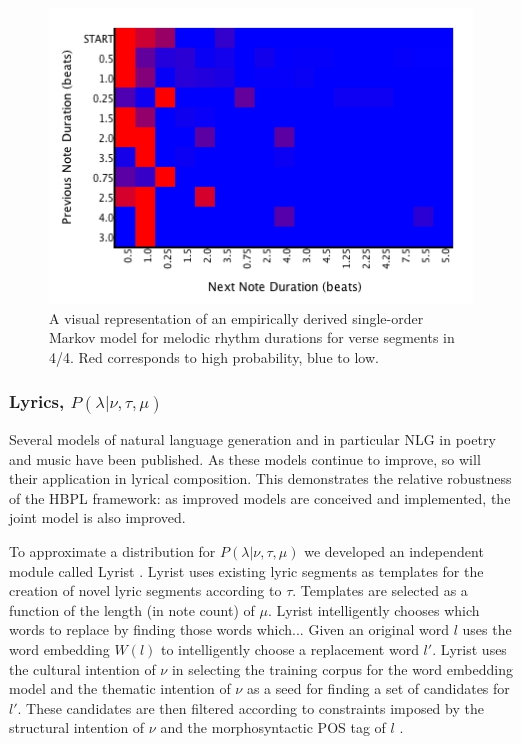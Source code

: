 \documentclass[letterpaper]{article}
\begin{document}
\begin{figure}[t]
	\centering
	\includegraphics[width=\linewidth]{melody_rhythm}
	\caption{\label{fig:melody_rhythm} A visual representation of an empirically derived single-order Markov model for melodic rhythm durations for verse segments in 4/4. Red corresponds to high probability, blue to low.}
\end{figure}

\subsubsection{Lyrics, $P(\lambda|\nu,\tau,\mu)$}

Several models of natural language generation and in particular NLG in poetry and music have been published. As these models continue to improve, so will their application in lyrical composition. This demonstrates the relative robustness of the HBPL framework: as improved models are conceived and implemented, the joint model is also improved.

To approximate a distribution for $P(\lambda|\nu,\tau,\mu)$ we developed an independent module called Lyrist \cite{bay:inpress-a}. Lyrist uses existing lyric segments as templates for the creation of novel lyric segments according to $\tau$. Templates are selected as a function of the length (in note count) of $\mu$. Lyrist intelligently chooses which words to replace by finding those words which... Given an original word $l$ uses the word embedding $W(l)$ to intelligently choose a replacement word $l'$. Lyrist uses the cultural intention of $\nu$ in selecting the training corpus for the word embedding model and the thematic intention of $\nu$ as a seed for finding a set of candidates for $l'$. These candidates are then filtered according to constraints imposed by the structural intention of $\nu$ and the morphosyntactic POS tag of $l$ \cite{bay:inpress-a}.
\end{document}
